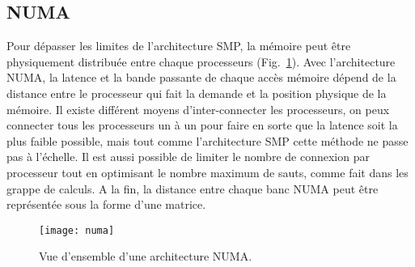 \subsection{NUMA}
Pour dépasser les limites de l'architecture SMP, la mémoire peut être physiquement distribuée entre chaque processeurs (Fig.~\ref{fig:numa}).
%
Avec l'architecture NUMA, la latence et la bande passante de chaque accès mémoire dépend de la distance entre le processeur qui fait la demande et la position physique de la mémoire.
%
Il existe différent moyens d'inter-connecter les processeurs, on peux connecter tous les processeurs un à un pour faire en sorte que la latence soit la plus faible possible, mais tout comme l'architecture SMP cette méthode ne passe pas à l'échelle.
%
Il est aussi possible de limiter le nombre de connexion par processeur tout en optimisant le nombre maximum de sauts, comme fait dans les grappe de calculs.
%
A la fin, la distance entre chaque banc NUMA peut être représentée sous la forme d'une matrice.

\begin{figure}[!ht]
  \centering
  \texttt{[image: numa]}
  \caption{Vue d'ensemble d'une architecture NUMA.}
  \label{fig:numa}
\end{figure}
